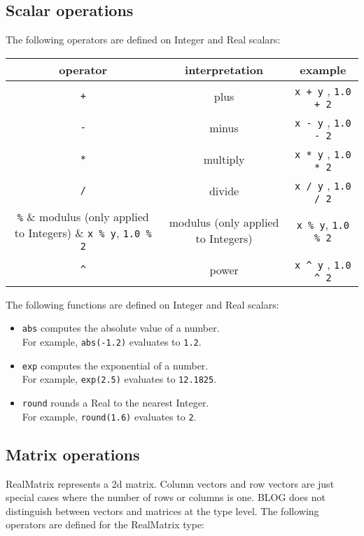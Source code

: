 \subsection{Scalar operations}
\label{sec:builtin-scalar-ops}

The following operators are defined on Integer and Real scalars:

\begin{table}[H]
\centering
\begin{tabular}{ c c c }
\toprule 
operator & interpretation & example \\
\midrule
\verb|+| & plus & \verb|x + y| , \verb|1.0 + 2|\\ 
\verb|-| & minus & \verb|x - y| , \verb|1.0 - 2|\\ 
\verb|*| & multiply & \verb|x * y| , \verb|1.0 * 2|\\
\verb|/| & divide & \verb|x / y| , \verb|1.0 / 2|\\ 
\verb|%| & modulus (only applied to Integers) & \verb|x % y|, \verb|1.0 % 2| \\
\verb|^| & power & \verb|x ^ y| , \verb|1.0 ^ 2| \\
\bottomrule
\end{tabular}
\end{table}

The following functions are defined on Integer and Real scalars:

\begin{itemize}
\item
    \verb|abs| computes the absolute value of a number. \\
    For example, \verb|abs(-1.2)| evaluates to \verb|1.2|.
\item
    \verb|exp| computes the exponential of a number. \\
    For example, \verb|exp(2.5)| evaluates to \verb|12.1825|.
\item
    \verb|round| rounds a Real to the nearest Integer. \\
    For example, \verb|round(1.6)| evaluates to \verb|2|.
\end{itemize}


\subsection{Matrix operations}
\label{sec:builtin-matrix-ops}

RealMatrix represents a 2d matrix. Column vectors and row vectors are just
special cases where the number of rows or columns is one. BLOG does not
distinguish between vectors and matrices at the type level. The following
operators are defined for the RealMatrix type:

